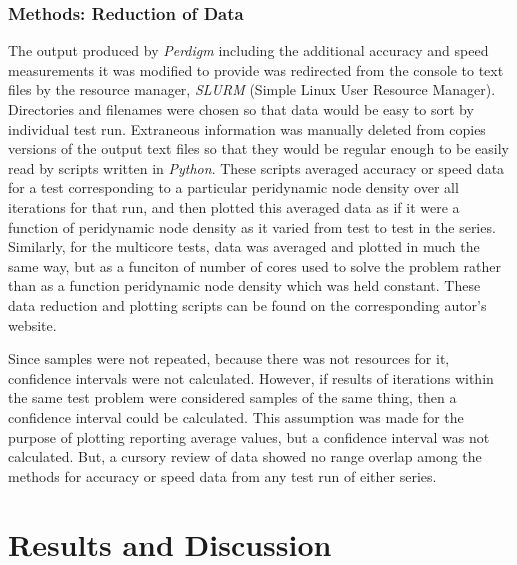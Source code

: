 \documentclass[preprint,12pt]{elsarticle}
\begin{document}
\subsubsection{Methods: Reduction of Data} The output produced by \emph{Perdigm} including the
additional accuracy and speed measurements it was modified to provide was redirected from the
console to text files by the resource manager, \emph{SLURM} (Simple Linux User Resource Manager).
Directories and filenames were chosen so that data would be easy to sort by individual test run.
Extraneous information was manually deleted from copies versions of the output text files so that
they would be regular enough to be easily read by scripts written in \emph{Python}. These scripts
averaged accuracy or speed data for a test corresponding to a particular peridynamic node density
over all iterations for that run, and then plotted this averaged data as if it were a function of
peridynamic node density as it varied from test to test in the series.  Similarly, for the multicore
tests, data was averaged and plotted in much the same way, but as a funciton of number of cores used
to solve the problem rather than as a function peridynamic node density which was held constant.
These data reduction and plotting scripts can be found on the corresponding autor's website.

Since samples were not repeated, because there was not resources for it, confidence intervals were
not calculated. However, if results of iterations within the same test problem were considered
samples of the same thing, then a confidence interval could be calculated. This assumption was made
for the purpose of plotting reporting average values, but a confidence interval was not calculated.
But, a cursory review of data showed no range overlap among the methods for accuracy or speed data
from any test run of either series.

\section{Results and Discussion}
\end{document}
